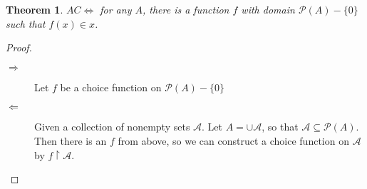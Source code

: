 \documentclass[12pt]{article}
\newcommand{\power}[1]{\mathscr{P}(#1)}
\newtheorem*{theorem*}{Theorem}
\begin{document}
\begin{description}
\begin{theorem*}
  $AC \Leftrightarrow$ for any $A$, there is a function $f$ with domain
  $\power{A}-\{0\}$ such that $f(x) \in x$.
\end{theorem*}
\begin{proof}
\begin{description}
\item[$\Rightarrow$] Let $f$ be a choice function on
$\power{A}-\{0\}$
\item[$\Leftarrow$]  Given a collection of nonempty sets $\mathscr{A}$.
Let $A = \cup\mathscr{A}$, so that $\mathscr{A} \subseteq \power{A}$.
Then there is an $f$ from above, so we can construct a choice function
on $\mathscr{A}$ by $f \upharpoonright \mathscr{A}$.
\end{description}
\end{proof}
\end{description}
\end{document}
